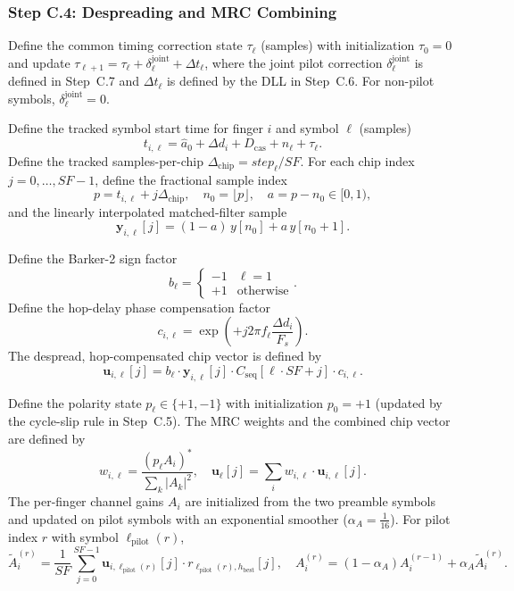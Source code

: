 \documentclass[11pt]{article}
\begin{document}
\subsubsection{Step C.4: Despreading and MRC Combining}

Define the common timing correction state $\tau_\ell$ (samples) with initialization $\tau_0=0$ and update
$\tau_{\ell+1}=\tau_\ell+\delta_\ell^{\mathrm{joint}}+\Delta t_\ell$, where the joint pilot correction
$\delta_\ell^{\mathrm{joint}}$ is defined in Step~C.7 and $\Delta t_\ell$ is defined by the DLL in
Step~C.6. For non-pilot symbols, $\delta_\ell^{\mathrm{joint}}=0$.

Define the tracked symbol start time for finger $i$ and symbol $\ell$ (samples)
\[
  t_{i,\ell}=\hat a_0+\Delta d_i+D_{\text{cas}}+n_\ell+\tau_\ell.
\]
Define the tracked samples-per-chip $\Delta_{\text{chip}}=\mathit{step}_\ell/\mathit{SF}$. For each chip index $j=0,\dots,\mathit{SF}-1$, define the fractional sample index
\[
  p=t_{i,\ell}+j\Delta_{\text{chip}},\quad n_0=\lfloor p\rfloor,\quad a=p-n_0\in[0,1),
\]
and the linearly interpolated matched-filter sample
\[
  \mathbf{y}_{i,\ell}[j]=(1-a)\,y[n_0]+a\,y[n_0+1].
\]

Define the Barker-2 sign factor
\[
  b_\ell=
  \begin{cases}
  -1 & \ell=1\\
  +1 & \text{otherwise}
  \end{cases}.
\]
Define the hop-delay phase compensation factor
\[
  c_{i,\ell}=\exp\!\left(+j2\pi f_\ell \frac{\Delta d_i}{F_s}\right).
\]
The despread, hop-compensated chip vector is defined by
\[
  \mathbf{u}_{i,\ell}[j]=b_\ell\cdot \mathbf{y}_{i,\ell}[j]\cdot C_{\text{seq}}[\ell\cdot \mathit{SF}+j]\cdot c_{i,\ell}.
\]

Define the polarity state $p_\ell\in\{+1,-1\}$ with initialization $p_0=+1$ (updated by the cycle-slip rule in Step~C.5). The MRC weights and the combined chip vector are defined by
\[
  w_{i,\ell}=\frac{(p_\ell A_i)^*}{\sum_k |A_k|^2},\quad \mathbf{u}_{\ell}[j]=\sum_i w_{i,\ell}\cdot \mathbf{u}_{i,\ell}[j].
\]
The per-finger channel gains $A_i$ are initialized from the two preamble symbols and updated on pilot symbols with an exponential smoother ($\alpha_A=\frac{1}{16}$). For pilot index $r$ with symbol $\ell_{\text{pilot}}(r)$,
\[
  \tilde A_i^{(r)}=\frac{1}{\mathit{SF}}\sum_{j=0}^{\mathit{SF}-1}\mathbf{u}_{i,\ell_{\text{pilot}}(r)}[j]\cdot r_{\ell_{\text{pilot}}(r),h_{\text{best}}}[j],\quad
  A_i^{(r)}=(1-\alpha_A)A_i^{(r-1)}+\alpha_A\tilde A_i^{(r)}.
\]
\end{document}
